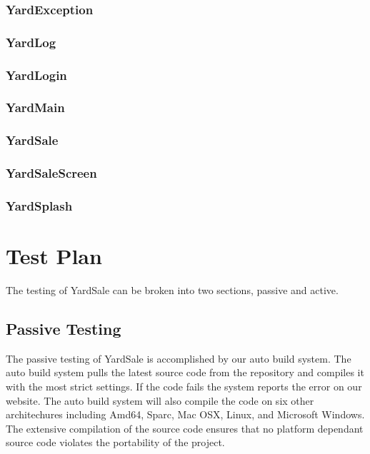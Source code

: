 \documentclass{report}
\begin{document}
{{{{    \subsection{YardException}

    \subsection{YardLog}

    \subsection{YardLogin}

    \subsection{YardMain}

    \subsection{YardSale}

    \subsection{YardSaleScreen}

    \subsection{YardSplash}

\chapter{Test Plan}

The testing of YardSale can be broken into two sections, passive and active.

\section{Passive Testing}

The passive testing of YardSale is accomplished by our auto build system.  The auto build system pulls the latest source
code from the repository and compiles it with the most strict settings.  If the code fails the system reports the error
on our website.  The auto build system will also compile the code on six other architechures including Amd64, Sparc, Mac OSX,
Linux, and Microsoft Windows.  The extensive compilation of the source code ensures that no platform dependant source code
violates the portability of the project.

}}}}
\end{document}
